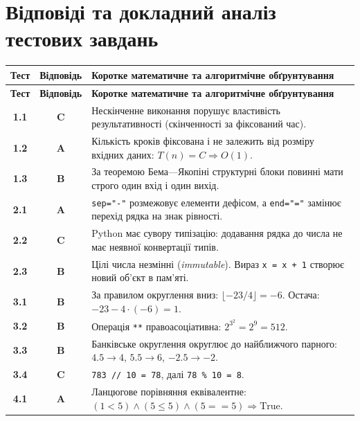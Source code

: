 \section{Відповіді та докладний аналіз тестових завдань}

\renewcommand{\arraystretch}{1.2}
\begin{longtable}{|c|c|p{11.5cm}|}
	\hline
	\textbf{Тест} & \textbf{Відповідь} & \textbf{Коротке математичне та алгоритмічне обґрунтування} \\ \hline
	\endfirsthead
	\hline
	\textbf{Тест} & \textbf{Відповідь} & \textbf{Коротке математичне та алгоритмічне обґрунтування} \\ \hline
	\endhead
	\hline
	\endfoot
	\textbf{1.1} & \textbf{C} & Нескінченне виконання порушує властивість результативності (скінченності за фіксований час). \\ \hline
	\textbf{1.2} & \textbf{A} & Кількість кроків фіксована і не залежить від розміру вхідних даних: $T(n) = C \Rightarrow O(1)$. \\ \hline
	\textbf{1.3} & \textbf{B} & За теоремою Бема---Якопіні структурні блоки повинні мати строго один вхід і один вихід. \\ \hline
	\textbf{2.1} & \textbf{A} & \texttt{sep="-"} розмежовує елементи дефісом, а \texttt{end="="} замінює перехід рядка на знак рівності. \\ \hline
	\textbf{2.2} & \textbf{C} & Python має сувору типізацію: додавання рядка до числа не має неявної конвертації типів. \\ \hline
	\textbf{2.3} & \textbf{B} & Цілі числа незмінні (\textit{immutable}). Вираз \texttt{x = x + 1} створює новий об'єкт в пам'яті. \\ \hline
	\textbf{3.1} & \textbf{B} & За правилом округлення вниз: $\lfloor -23/4 \rfloor = -6$. Остача: $-23 - 4 \cdot (-6) = 1$. \\ \hline
	\textbf{3.2} & \textbf{B} & Операція \texttt{**} правоасоціативна: $2^{3^2} = 2^9 = 512$. \\ \hline
	\textbf{3.3} & \textbf{B} & Банківське округлення округлює до найближчого парного: $4.5 \to 4$, $5.5 \to 6$, $-2.5 \to -2$. \\ \hline
	\textbf{3.4} & \textbf{C} & \texttt{783 // 10 = 78}, далі \texttt{78 \% 10 = 8}. \\ \hline
	\textbf{4.1} & \textbf{A} & Ланцюгове порівняння еквівалентне: $(1 < 5) \land (5 \le 5) \land (5 == 5) \Rightarrow \text{True}$. \\ \hline

\end{longtable}
